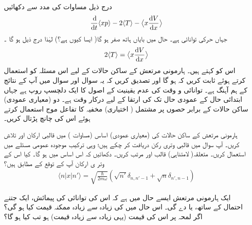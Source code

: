 \quad
 درج ذیل مساوات  کی مدد سے دکھائیں 
\begin{align}
\frac{\dif}{\dif t} \langle xp \rangle -2\langle T \rangle - \big\langle x \frac{\dif V}{\dif x} \big\rangle
\end{align}
جہاں  حرکی توانائی  ہے۔ حال میں بایاں ہاتھ صفر ہو گا( ایسا کیوں ہے؟) لہٰذا درج ذیل ہو گا ۔
\begin{align}
2\langle T \rangle = \big\langle x \frac{\dif V}{\dif x} \big\rangle
\end{align}
اس کو  کہتے ہیں۔ ہارمونی مرتعش کے ساکن حالات کے لیے اس مسئلہ کو استعمال کرتے ہوئے ثابت کریں کہ  ہو گا اور تصدیق کریں کہ یہ سوال اور سوال  میں آپ کے نتائج کے ہم آہنگ ہے۔
توانائی و وقت کی عدم یقینیت کے اصول کا ایک دلچسپ روپ  ہے جہاں ابتدائی حال  کے عمودی حال تک  کی ارتقا کے لیے درکار وقت  ہے۔ دو (معیاری عمودی) ساکن حالات کے برابر حصوں پر مشتمل ( اختیاری) مخفیہ کا تفاعل موج  استعمال کرتے ہوئے اس کی چانچ پڑتال کریں۔

ہارمونی مرتعش کے ساکن حالات کی (معیاری عمودی) اساس (مساوات ) میں قالبی ارکان  اور  تلاش کریں۔ آپ سوال  میں قالبی وتری رکن  دریافت کر چکے ہیں؛ وہی ترکیب موجودہ عمومی مسئلے میں استعمال کریں۔ متعلقہ( لامتناہی) قالب  اور   مرتب کریں۔ دکھائیں کہ اس اساس میں
 ہو گا۔ کیا اس کے وتر ی ارکان آپ کے توقع کے مطابق ہیں؟
\begin{align}
\langle n|x|n'\rangle=\sqrt{\frac{\hslash}{2m\omega}}(\sqrt{n'}\delta_{n,n'-1}+\sqrt{n}\delta_{n',n-1})
\end{align}

ایک ہارمونی مرتعش ایسے حال میں ہے کہ اس کی توانائی کی پیمائش، ایک  جتنے احتمال کے ساتھ،  یا  دے گی۔ اس حال میں  کی زیادہ سے زیادہ ممکنہ قیمت کیا ہو گی؟ اگر لمحہ  پر اس کی قیمت (یہی زیادہ سے زیادہ قیمت) ہو تب  کیا ہو گا؟


